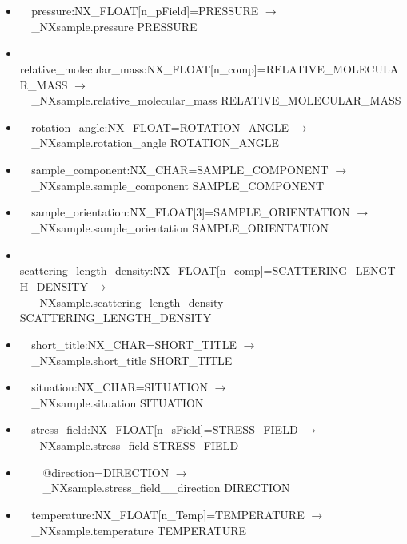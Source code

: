 \documentclass[11pt]{article}
\begin{document}
{{\begin{itemize}
\item{\verb|  |pressure:NX\_FLOAT[n\_pField]=PRESSURE $\rightarrow$\\
\verb|  |\_NXsample.pressure PRESSURE}

\item{\verb|  |relative\_molecular\_mass:NX\_FLOAT[n\_comp]=RELATIVE\_MOLECULAR\_MASS $\rightarrow$\\
\verb|  |\_NXsample.relative\_molecular\_mass RELATIVE\_MOLECULAR\_MASS}

\item{\verb|  |rotation\_angle:NX\_FLOAT=ROTATION\_ANGLE $\rightarrow$\\
\verb|  |\_NXsample.rotation\_angle ROTATION\_ANGLE}

\item{\verb|  |sample\_component:NX\_CHAR=SAMPLE\_COMPONENT $\rightarrow$\\
\verb|  |\_NXsample.sample\_component SAMPLE\_COMPONENT}

\item{\verb|  |sample\_orientation:NX\_FLOAT[3]=SAMPLE\_ORIENTATION $\rightarrow$\\
\verb|  |\_NXsample.sample\_orientation SAMPLE\_ORIENTATION}

\item{\verb|  |scattering\_length\_density:NX\_FLOAT[n\_comp]=SCATTERING\_LENGTH\_DENSITY $\rightarrow$\\
\verb|  |\_NXsample.scattering\_length\_density SCATTERING\_LENGTH\_DENSITY}

\item{\verb|  |short\_title:NX\_CHAR=SHORT\_TITLE $\rightarrow$\\
\verb|  |\_NXsample.short\_title SHORT\_TITLE}

\item{\verb|  |situation:NX\_CHAR=SITUATION $\rightarrow$\\
\verb|  |\_NXsample.situation SITUATION}

\item{\verb|  |stress\_field:NX\_FLOAT[n\_sField]=STRESS\_FIELD $\rightarrow$\\
\verb|  |\_NXsample.stress\_field STRESS\_FIELD}

\item{\verb|    |@direction=DIRECTION $\rightarrow$\\
\verb|    |\_NXsample.stress\_field\_\_direction DIRECTION}

\item{\verb|  |temperature:NX\_FLOAT[n\_Temp]=TEMPERATURE $\rightarrow$\\
\verb|  |\_NXsample.temperature TEMPERATURE}


\end{itemize}}}
\end{document}
